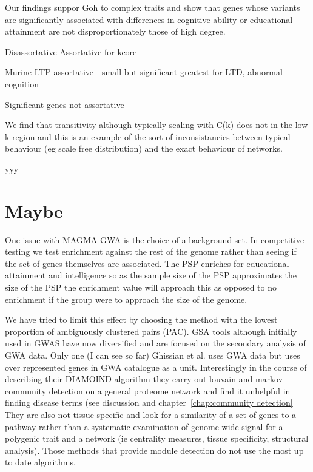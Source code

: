 


Our findings suppor Goh to complex traits and show that genes whose variants are significantly associated with differences in cognitive ability or educational attainment are not disproportionately those of high degree\cite{goh2007human}. 
 	
 	
 		Disassortative
 	Assortative for kcore
 	
 	Murine LTP assortative - small but significant greatest for LTD, abnormal cognition
 	
 	Significant genes not assortative
 	
 	
 	We find that transitivity although typically scaling with C(k) does not in the low k region and this is an example of the sort of inconsistancies between typical behaviour (eg scale free distribution) and the exact behaviour of networks. 
 	
 	
 	
 	yyy
 	
 	\section{Maybe}
 	
One issue with MAGMA GWA is the choice of a background set. In competitive testing we test enrichment against the rest of the genome rather than seeing if the set of genes themselves are associated. The PSP enriches for educational attainment and intelligence so as the sample size of the PSP approximates the size of the PSP the enrichment value will approach this as opposed to no enrichment if the group were to approach the size of the genome. 


 	 We have tried to limit this effect by choosing the method with the lowest proportion of ambiguously clustered pairs (PAC).
 	 GSA tools although initially used in GWAS have now diversified and are focused on the secondary analysis of GWA data. Only one (I can see so far) Ghissian  et al.\cite{ghiassian2015disease} uses GWA data but uses over represented genes in GWA catalogue as a unit. Interestingly in the course of describing their DIAMOIND algorithm they carry out louvain and markov community detection on a general proteome network and find it unhelpful in finding disease terms (see discussion and chapter~\ref{chap:community detection} They are also not tissue specific and look for a similarity of a set of genes to a pathway rather than a systematic examination of genome wide signal for a polygenic trait and a network (ie centrality measures, tissue specificity, structural analysis). Those methods that provide module detection do not use the most up to date algorithms. 
 	 

